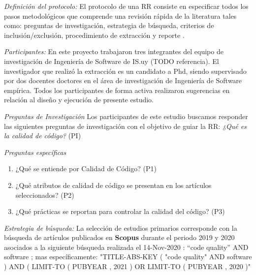 \documentclass[conference]{IEEEtran}
\begin{document}
\textit{ Definición del protocolo:}  El protocolo de una RR consiste en especificar todos los pasos metodológicos que comprende una  revisión rápida de la literatura tales como:  preguntas de investigación, estrategia de búsqueda, criterios de inclusión/exclusión, procedimiento de extracción y reporte \cite{cartaxo2020rapid}.  

\textit{Participantes: } En este proyecto trabajaron tres integrantes del equipo de investigación de Ingeniería de Software de IS.uy (TODO referencia). El investigador que realizó la extracción  es un candidato a Phd, siendo supervisado por dos docentes doctores en el área de investigación de Ingeniería de Software empírica.  Todos los participantes de forma activa realizaron sugerencias en relación al diseño y ejecución de presente estudio. %

\textit{Preguntas de Investigación}
Los participantes de este estudio buscamos responder las siguientes preguntas de investigación con el objetivo de guiar la RR:
\textit{¿Qué es la calidad de código?} (PI)

    \textit{Preguntas específicas}
   \begin{enumerate}
   \item  ¿Qué se entiende por Calidad de Código? (P1)
   \item ¿Qué atributos de calidad de código se presentan en los artículos seleccionados? (P2)
    \item ¿Qué prácticas se reportan para controlar la calidad del código? (P3)
   
\end{enumerate}

\textit{Estrategia de búsqueda: } 
 La selección de estudios primarios corresponde con la búsqueda de artículos publicados en \textbf{Scopus} durante el periodo 2019 y 2020 asociados a la siguiente búsqueda realizada el 14-Nov-2020 : “code quality” AND software ; mas específicamente: 
 "TITLE-ABS-KEY ( "code quality" AND software ) AND ( LIMIT-TO ( PUBYEAR , 2021 ) OR LIMIT-TO ( PUBYEAR , 2020 )" 
 

\end{document}
